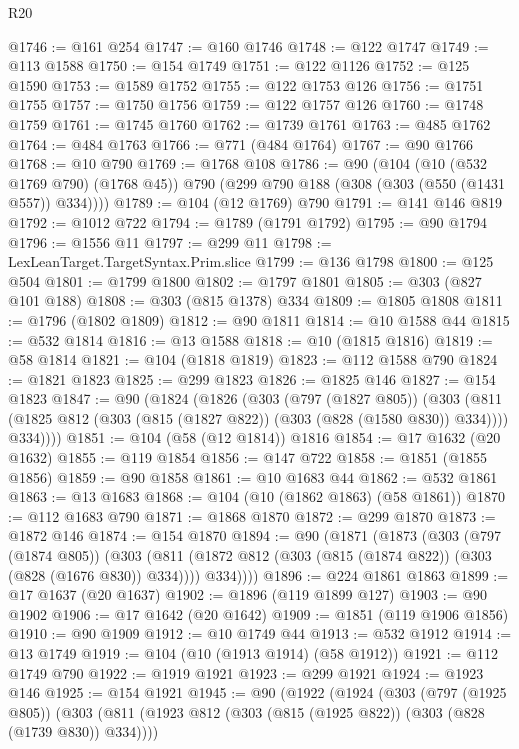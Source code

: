 \begin{lexlean}{R20}
\begin{coremodule}
@1746 := @161 @254
@1747 := @160 @1746
@1748 := @122 @1747
@1749 := @113 @1588
@1750 := @154 @1749
@1751 := @122 @1126
@1752 := @125 @1590
@1753 := @1589 @1752
@1755 := @122 @1753 @126
@1756 := @1751 @1755
@1757 := @1750 @1756
@1759 := @122 @1757 @126
@1760 := @1748 @1759
@1761 := @1745 @1760
@1762 := @1739 @1761
@1763 := @485 @1762
@1764 := @484 @1763
@1766 := @771 (@484 @1764)
@1767 := @90 @1766
@1768 := @10 @790
@1769 := @1768 @108
@1786 := @90
    (@104
      (@10 (@532 @1769 @790) (@1768 @45))
      @790
      (@299 @790 @188 (@308 (@303 (@550 (@1431 @557)) @334))))
@1789 := @104 (@12 @1769) @790
@1791 := @141 @146 @819
@1792 := @1012 @722
@1794 := @1789 (@1791 @1792)
@1795 := @90 @1794
@1796 := @1556 @11
@1797 := @299 @11
@1798 := LexLeanTarget.TargetSyntax.Prim.slice
@1799 := @136 @1798
@1800 := @125 @504
@1801 := @1799 @1800
@1802 := @1797 @1801
@1805 := @303 (@827 @101 @188)
@1808 := @303 (@815 @1378) @334
@1809 := @1805 @1808
@1811 := @1796 (@1802 @1809)
@1812 := @90 @1811
@1814 := @10 @1588 @44
@1815 := @532 @1814
@1816 := @13 @1588
@1818 := @10 (@1815 @1816)
@1819 := @58 @1814
@1821 := @104 (@1818 @1819)
@1823 := @112 @1588 @790
@1824 := @1821 @1823
@1825 := @299 @1823
@1826 := @1825 @146
@1827 := @154 @1823
@1847 := @90
    (@1824
      (@1826
        (@303
          (@797 (@1827 @805))
          (@303
            (@811 (@1825 @812 (@303 (@815 (@1827 @822)) (@303 (@828 (@1580 @830)) @334))))
            @334))))
@1851 := @104 (@58 (@12 @1814)) @1816
@1854 := @17 @1632 (@20 @1632)
@1855 := @119 @1854
@1856 := @147 @722
@1858 := @1851 (@1855 @1856)
@1859 := @90 @1858
@1861 := @10 @1683 @44
@1862 := @532 @1861
@1863 := @13 @1683
@1868 := @104 (@10 (@1862 @1863) (@58 @1861))
@1870 := @112 @1683 @790
@1871 := @1868 @1870
@1872 := @299 @1870
@1873 := @1872 @146
@1874 := @154 @1870
@1894 := @90
    (@1871
      (@1873
        (@303
          (@797 (@1874 @805))
          (@303
            (@811 (@1872 @812 (@303 (@815 (@1874 @822)) (@303 (@828 (@1676 @830)) @334))))
            @334))))
@1896 := @224 @1861 @1863
@1899 := @17 @1637 (@20 @1637)
@1902 := @1896 (@119 @1899 @127)
@1903 := @90 @1902
@1906 := @17 @1642 (@20 @1642)
@1909 := @1851 (@119 @1906 @1856)
@1910 := @90 @1909
@1912 := @10 @1749 @44
@1913 := @532 @1912
@1914 := @13 @1749
@1919 := @104 (@10 (@1913 @1914) (@58 @1912))
@1921 := @112 @1749 @790
@1922 := @1919 @1921
@1923 := @299 @1921
@1924 := @1923 @146
@1925 := @154 @1921
@1945 := @90
    (@1922
      (@1924
        (@303
          (@797 (@1925 @805))
          (@303
            (@811 (@1923 @812 (@303 (@815 (@1925 @822)) (@303 (@828 (@1739 @830)) @334))))

\end{coremodule}
\end{lexlean}
